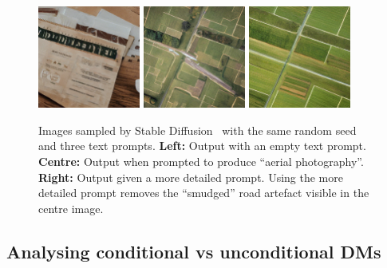 \begin{figure}[t]
    \centering
    \includegraphics[width=0.3\textwidth]{figs/2sdm/sd_uncond.png}
    \hfill
    \includegraphics[width=0.3\textwidth]{figs/2sdm/uncond-aerial-photo.jpg}
    \hfill
    \includegraphics[width=0.3\textwidth]{figs/2sdm/cond-aerial-photo.jpg}
    \caption{Images sampled by Stable Diffusion~\citep{rombach2022high} with the same random seed and three text prompts. \textbf{Left:} Output with an empty text prompt. \textbf{Centre:} Output when prompted to produce ``aerial photography''. \textbf{Right:} Output given a more detailed prompt\protect\footnotemark. Using the more detailed prompt removes the ``smudged'' road artefact visible in the centre image.}
    \label{fig:stable-diffusion-example}
\end{figure}

\subsection{Analysing conditional vs unconditional DMs} \label{sec:2sdm-cond-vs-uncond-dgms}


